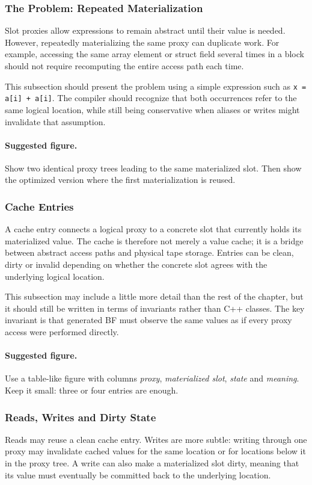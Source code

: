 \subsubsection{The Problem: Repeated Materialization}
Slot proxies allow expressions to remain abstract until their value is needed. However, repeatedly materializing the same proxy can duplicate work. For example, accessing the same array element or struct field several times in a block should not require recomputing the entire access path each time.

This subsection should present the problem using a simple expression such as \texttt{x = a[i] + a[i]}. The compiler should recognize that both occurrences refer to the same logical location, while still being conservative when aliases or writes might invalidate that assumption.

\paragraph{Suggested figure.}
Show two identical proxy trees leading to the same materialized slot. Then show the optimized version where the first materialization is reused.

\subsubsection{Cache Entries}
A cache entry connects a logical proxy to a concrete slot that currently holds its materialized value. The cache is therefore not merely a value cache; it is a bridge between abstract access paths and physical tape storage. Entries can be clean, dirty or invalid depending on whether the concrete slot agrees with the underlying logical location.

This subsection may include a little more detail than the rest of the chapter, but it should still be written in terms of invariants rather than C++ classes. The key invariant is that generated BF must observe the same values as if every proxy access were performed directly.

\paragraph{Suggested figure.}
Use a table-like figure with columns \emph{proxy}, \emph{materialized slot}, \emph{state} and \emph{meaning}. Keep it small: three or four entries are enough.

\subsubsection{Reads, Writes and Dirty State}
Reads may reuse a clean cache entry. Writes are more subtle: writing through one proxy may invalidate cached values for the same location or for locations below it in the proxy tree. A write can also make a materialized slot dirty, meaning that its value must eventually be committed back to the underlying location.


